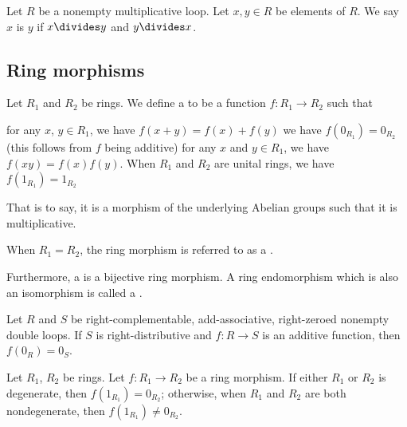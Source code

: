 \begin{definition}
Let $R$ be a nonempty multiplicative loop. Let $x,y\in R$ be elements
of $R$. We say $x$ is  $y$ if $x\divides y$ and
$y\divides x$.
\end{definition}

\subsection{Ring morphisms}

\begin{definition}
Let $R_{1}$ and $R_{2}$ be rings. We define a 
to be a function $f\colon R_{1}\to R_{2}$ such that
\begin{itemize}
 for any $x$, $y\in R_{1}$, we have $f(x+y)=f(x)+f(y)$
 we have $f(0_{R_{1}})=0_{R_{2}}$ (this
follows from $f$ being additive)
 for any $x$ and $y\in R_{1}$, we have $f(xy)=f(x)f(y)$.
 When $R_{1}$ and $R_{2}$ are unital rings,
  we have $f(1_{R_{1}})=1_{R_{2}}$
\end{itemize}%
That is to say, it is a morphism of the underlying Abelian groups such
that it is multiplicative.

When $R_{1} = R_{2}$, the ring morphism is referred to as a
.

Furthermore, a  is a bijective ring morphism.
A ring endomorphism which is also an isomorphism is called a
.
\end{definition}

\begin{theorem}
Let $R$ and $S$ be right-complementable, add-associative, right-zeroed
nonempty double loops. If $S$ is right-distributive and $f\colon R\to S$
is an additive function, then $f(0_{R})=0_{S}$.
\end{theorem}

\begin{theorem}
Let $R_{1}$, $R_{2}$ be rings.
Let $f\colon R_{1}\to R_{2}$ be a ring morphism.
If either $R_{1}$ or $R_{2}$ is degenerate, then $f(1_{R_{1}})=0_{R_{2}}$;
otherwise, when $R_{1}$ and $R_{2}$ are both nondegenerate, then $f(1_{R_{1}})\neq0_{R_{2}}$.
\end{theorem}

